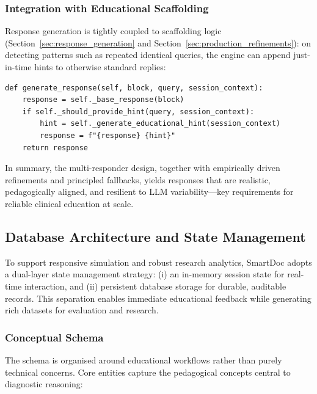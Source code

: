 \subsubsection{Integration with Educational Scaffolding}

Response generation is tightly coupled to scaffolding logic
(Section~\ref{sec:response_generation} and Section~\ref{sec:production_refinements}):
on detecting patterns such as repeated identical queries, the engine can append
just-in-time hints to otherwise standard replies:
\begin{verbatim}
def generate_response(self, block, query, session_context):
    response = self._base_response(block)
    if self._should_provide_hint(query, session_context):
        hint = self._generate_educational_hint(session_context)
        response = f"{response} {hint}"
    return response
\end{verbatim}

\noindent
In summary, the multi-responder design, together with empirically driven
refinements and principled fallbacks, yields responses that are realistic,
pedagogically aligned, and resilient to LLM variability—key requirements for
reliable clinical education at scale.

\subsection{Database Architecture and State Management}
\label{sec:db_arch}

To support responsive simulation and robust research analytics, SmartDoc adopts a
dual-layer state management strategy:
(i) an in-memory session state for real-time interaction, and
(ii) persistent database storage for durable, auditable records. This separation
enables immediate educational feedback while generating rich datasets for
evaluation and research.

\subsubsection{Conceptual Schema}

The schema is organised around educational workflows rather than purely technical
concerns. Core entities capture the pedagogical concepts central to diagnostic
reasoning:

